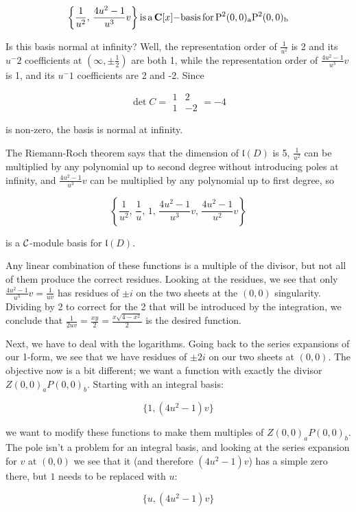 $$\left\{\frac{1}{u^2},\,\frac{4u^2-1}{u^3}v\right\} {\rm is\, a\,} {\bf C}[x]{\rm -basis\, for\, P^2(0,0)_aP^2(0,0)_b}$$

Is this basis normal at infinity?  Well, the representation order of
$\frac{1}{u^2}$ is 2 and its $u^-2$ coefficients at $(\infty, \pm
\frac12)$ are both 1, while the representation order of $\frac{4u^2-1}{u^3}v$
is 1, and its $u^-1$ coefficients are 2 and -2.  Since

$$\det C = \begin{array}{|cc|} 1 & 2 \\ 1 & -2 \end{array} = -4$$

is non-zero, the basis is normal at infinity.

The Riemann-Roch theorem says that the dimension of ${\mathfrak l}(D)$ is 5,
$\frac{1}{u^2}$ can be multiplied by any polynomial up to second
degree without introducing poles at infinity, and $\frac{4u^2-1}{u^3}v$
can be multiplied by any polynomial up to first degree, so

$$\left\{\frac{1}{u^2},\, \frac{1}{u},\, 1,\, \frac{4u^2-1}{u^3}v,\, \frac{4u^2-1}{u^2}v\right\}$$

is a ${\cal C}$-module basis for ${\mathfrak l}(D)$.

Any linear combination of these functions is a multiple of the
divisor, but not all of them produce the correct residues.  Looking at
the residues, we see that only $\frac{4u^2-1}{u^3}v = \frac{1}{uv}$
has residues of $\pm i$ on the two sheets at the $(0,0)$ singularity.
Dividing by 2 to correct for the 2 that will be introduced by the
integration, we conclude that $\frac{1}{2uv} = \frac{xy}{2} =
\frac{x\sqrt{4-x^2}}{2}$ is the desired function.

Next, we have to deal with the logarithms.  Going back to the
series expansions of our 1-form, we see that we have residues
of $\pm 2i$ on our two sheets at $(0,0)$.  The objective
now is a bit different; we want a function with exactly
the divisor $Z(0,0)_a P(0,0)_b$.  Starting with an integral basis:

$$\{1, (4u^2-1)v\}$$

we want to modify these functions to make them multiples
of $Z(0,0)_a P(0,0)_b$.  The pole isn't a problem for
an integral basis, and looking at the series expansion
for $v$ at $(0,0)$ we see that it (and therefore $(4u^2-1)v$)
has a simple zero there, but $1$ needs to be replaced with $u$:

$$\{u, (4u^2-1)v\}$$

